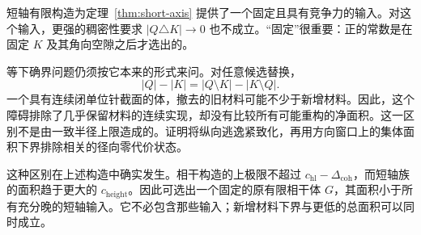 短轴有限构造为定理~\ref{thm:short-axis} 提供了一个固定且具有竞争力的输入。对这个输入，更强的稠密性要求 $|Q\triangle K|\to0$ 也不成立。“固定”很重要：正的常数是在固定 $K$ 及其角向空隙之后才选出的。

等下确界问题仍须按它本来的形式来问。对任意候选替换，
\[
 |Q|-|K|=|Q\setminus K|-|K\setminus Q|.
\]
一个具有连续闭单位针截面的体，撤去的旧材料可能不少于新增材料。因此，这个障碍排除了几乎保留材料的连续实现，却没有比较所有可能重构的净面积。这一区别不是由一致半径上限造成的。证明将纵向逃逸紧致化，再用方向窗口上的集体面积下界排除相关的径向零代价状态。


这种区别在上述构造中确实发生。相干构造的上极限不超过 $c_{\mathrm{hl}}-\Delta_{\mathrm{coh}}$，而短轴族的面积趋于更大的 $c_{\mathrm{height}}$。因此可选出一个固定的原有限相干体 $G$，其面积小于所有充分晚的短轴输入。它不必包含那些输入；新增材料下界与更低的总面积可以同时成立。

